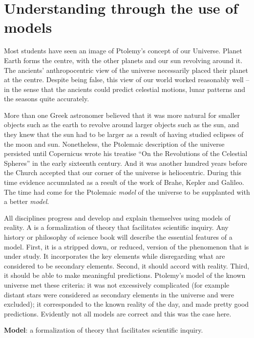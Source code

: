 \section{Understanding through the use of models}\label{sec:ch1sec2}

Most students have seen an image of Ptolemy's concept of our Universe.  Planet Earth forms the centre, with the other planets and our sun revolving around it. The ancients' anthropocentric view of the universe necessarily placed their planet at the centre. Despite being false, this view of our world worked reasonably well -- in the sense that the ancients could predict celestial motions, lunar patterns and the seasons quite accurately. 

More than one Greek astronomer believed that it was more natural for smaller objects such as the earth to revolve around larger objects such as the sun, and they knew that the sun had to be larger as a result of having studied eclipses of the moon and sun. Nonetheless, the Ptolemaic description of the universe persisted until Copernicus wrote his treatise ``On the Revolutions of the Celestial Spheres'' in the early sixteenth century. And it was another hundred years before the Church accepted that our corner of the universe is heliocentric. During this time evidence accumulated as a result of the work of Brahe, Kepler and Galileo. The time had come for the Ptolemaic \textit{model} of the universe to be supplanted with a better \textit{model}. 

All disciplines progress and develop and explain themselves using models of reality. A  is a formalization of theory that facilitates scientific inquiry. Any history or philosophy of science book will describe the essential features of a model. First, it is a stripped down, or reduced, version of the phenomenon that is under study. It incorporates the key elements while disregarding what are considered to be secondary elements. Second, it should accord with reality. Third, it should be able to make meaningful predictions. Ptolemy's model of the known universe met these criteria: it was not excessively complicated (for example distant stars were considered as secondary elements in the universe and were excluded); it corresponded to the known reality of the day, and made pretty good predictions. Evidently not all models are correct and this was the case here.

\begin{DefBox}
\textbf{Model}: a formalization of theory that facilitates scientific inquiry.
\end{DefBox}

